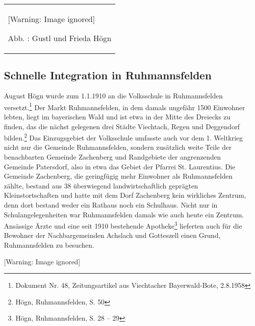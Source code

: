 \documentclass[a4paper]{article}
\newcounter{Abb}
\renewcommand\theAbb{\arabic{Abb}}
\begin{document}
\begin{center}
\begin{minipage}{3.373cm}
\begin{center}
\tablefirsthead{}
\tablehead{}
\tabletail{}
\tablelasttail{}
\begin{supertabular}{m{3.1729999cm}}
  [Warning: Image ignored] %
 
Abb. \stepcounter{Abb}{\theAbb}: Gustl und Frieda Högn\\
\end{supertabular}
\end{center}
\end{minipage}
\end{center}
\subsection{Schnelle Integration in Ruhmannsfelden}
\hypertarget{RefHeadingToc100333729}{}August Högn wurde zum 1.1.1910 an
die Volksschule in Ruhmannsfelden versetzt.\footnote{ Dokument Nr. 48,
Zeitungsartikel aus Viechtacher Bayerwald-Bote, 2.8.1958} Der Markt
Ruhmannsfelden, in dem damals ungefähr 1500 Einwohner lebten, liegt im
bayerischen Wald und ist etwa in der Mitte des Dreiecks zu finden, das
die nächst gelegenen drei Städte Viechtach, Regen und Deggendorf
bilden.\footnote{ Högn, Ruhmannsfelden, S. 50} Das Einzugsgebiet der
Volksschule umfasste auch vor dem 1. Weltkrieg nicht nur die Gemeinde
Ruhmannsfelden, sondern zusätzlich weite Teile der benachbarten
Gemeinde Zachenberg und Randgebiete der angrenzenden Gemeinde
Patersdorf, also in etwa das Gebiet der Pfarrei St. Laurentius. Die
Gemeinde Zachenberg, die geringfügig mehr Einwohner als Ruhmannsfelden
zählte, bestand aus 38 überwiegend landwirtschaftlich geprägten
Kleinstortschaften und hatte mit dem Dorf Zachenberg kein wirkliches
Zentrum, denn dort bestand weder ein Rathaus noch ein Schulhaus. Nicht
nur in Schulangelegenheiten war Ruhmannsfelden damals wie auch heute
ein Zentrum. Ansässige Ärzte und eine seit 1910 bestehende
Apotheke\footnote{ Högn, Ruhmannsfelden, S. 28 – 29} lieferten auch für
die Bewohner der Nachbargemeinden Achslach und Gotteszell einen Grund,
Ruhmannsfelden zu besuchen.

  [Warning: Image ignored] %
 
\end{document}
